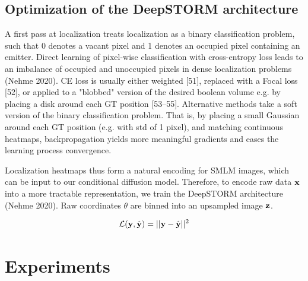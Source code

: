 \documentclass{article}
\begin{document}
\subsection{Optimization of the DeepSTORM architecture}

A first pass at localization treats localization as a binary classification problem, such that 0 denotes a vacant pixel and 1 denotes an occupied pixel containing an emitter. Direct learning of pixel-wise classification with cross-entropy loss leads to an imbalance of occupied and unoccupied pixels in dense localization problems (Nehme 2020). CE loss is usually either weighted [51], replaced with a Focal loss [52], or applied to a "blobbed" version of the desired boolean volume e.g. by placing a disk around each GT position [53–55]. Alternative methods take a soft version of the binary classification problem. That is, by placing a small Gaussian around each GT position (e.g. with std of 1 pixel), and matching continuous heatmaps, backpropagation yields more meaningful gradients and eases the learning process convergence. 

Localization heatmaps thus form a natural encoding for SMLM images, which can be input to our conditional diffusion model. Therefore, to encode raw data $\bold{x}$ into a more tractable representation, we train the DeepSTORM architecture (Nehme 2020). Raw coordinates $\theta$ are binned into an upsampled image $\bold{z}$. 

\begin{equation*}
\mathcal{L}(\bold{y},\hat{\bold{y}}) = \lvert\lvert\bold{y}- \hat{\bold{y}}\lvert\lvert^2
\end{equation*} 


\section{Experiments}
\end{document}
